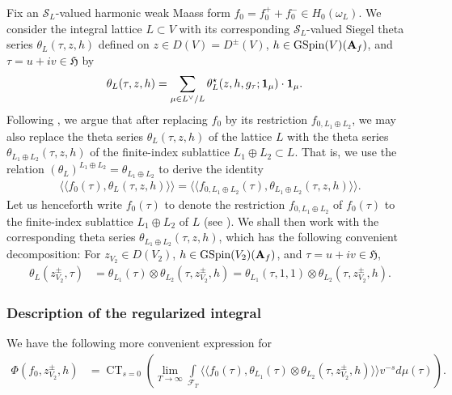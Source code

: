 \documentclass{amsart}
\theoremstyle{definition}
\begin{document}
Fix an $\mathcal{S}_{L}$-valued harmonic weak Maass form $f_0 = f_0^+ + f_0^- \in H_{0}(\omega_L)$.
We consider the integral lattice $L  \subset V$ with its corresponding $\mathcal{S}_{L}$-valued Siegel theta series 
$\theta_{L}(\tau, z, h)$ defined on $z \in D(V) = D^{\pm}(V)$, 
$h \in \operatorname{GSpin}(V)({\bf{A}}_f)$, and $\tau  = u + iv \in \mathfrak{H}$ by 
\begin{align*} \theta_{L}(\tau, z, h) &= \sum\limits_{ \mu \in L^{\vee}/L} \theta_{L}^{\star}(z, h, g_{\tau}; {\bf{1}}_{\mu }) \cdot {\bf{1}}_{\mu}. \end{align*}
Following \cite[(3.3), Lemma 3.1]{BY}, we argue that after replacing $f_0$ by its restriction $f_{0, L_1 \oplus L_2}$, 
we may also replace the theta series $\theta_{L}(\tau, z, h)$ of the lattice $L$ with the theta series 
$\theta_{L_1 \oplus L_2}(\tau, z, h)$ of the finite-index sublattice $L_1 \oplus L_2 \subset L$. That is, we use the relation 
$(\theta_{L})^{L_1 \oplus L_2}  = \theta_{L_1 \oplus L_2}$ to derive the identity
\begin{align*} \langle \langle f_0(\tau), \theta_{L}(\tau, z, h) \rangle \rangle 
= \langle \langle f_{0, L_1 \oplus L_2}(\tau), \theta_{L_1 \oplus L_2}(\tau, z, h) \rangle \rangle. \end{align*} 
Let us henceforth write $f_0(\tau)$ to denote the restriction $f_{0, L_1 \oplus L_2}$ of $f_0(\tau)$
to the finite-index sublattice $L_1 \oplus L_2$ of $L$ (see \cite[Lemma 3.1]{BY}). 
We shall then work with the corresponding theta series $\theta_{L_1 \oplus L_2}(\tau, z, h)$, 
which has the following convenient decomposition: 
For $z_{V_2} \in D(V_2)$, $h \in \operatorname{GSpin}(V_2)({\bf{A}}_f)$, and $\tau = u + iv \in \mathfrak{H}$, 
\begin{align}\label{splitting} \theta_{L}(z_{V_2}^{\pm}, \tau) 
&= \theta_{L_1}(\tau) \otimes \theta_{L_2}(\tau, z_{V_2}^{\pm}, h)
= \theta_{L_1}(\tau, 1, 1) \otimes \theta_{L_2}(\tau, z_{V_2}^{\pm}, h). \end{align} 

\subsubsection{Description of the regularized integral}

We have the following more convenient expression for 
\begin{align*}\Phi( f_0, z_{V_2}^{\pm}, h) &= \operatorname{CT}_{s=0} \left( 
\lim_{T \rightarrow \infty} \int\limits_{\mathcal{F}_T} \langle \langle f_0(\tau), \theta_{L_1}(\tau) 
\otimes \theta_{L_2}(\tau, z_{V_2}^{\pm}, h) \rangle \rangle v^{-s} d \mu(\tau) \right). \end{align*} 
\end{document}
